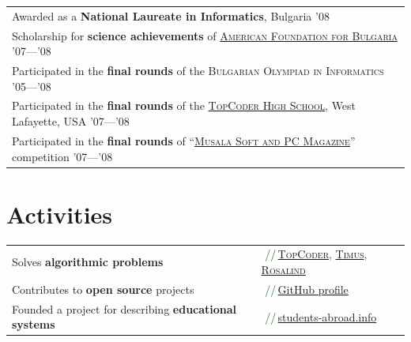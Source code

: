 \documentclass[a4paper,10pt]{article}
\newcommand{\comment}[1]{\small\textcolor{darkgreen}{\,\,//\,#1}}
\begin{document}
{\hspace{3mm}\begin{tabular}{@{•\enskip}p{14.5cm}}
	Awarded as a \textbf{National Laureate in Informatics}, Bulgaria \textsc{'08}\\
        Scholarship for \textbf{science achievements} of \href{http://www.afbulgaria.org/}{\textsc{American Foundation for Bulgaria}} \textsc{'07}---\textsc{'08}\\
	Participated in the \textbf{final rounds} of the \textsc{Bulgarian Olympiad in Informatics} \textsc{'05}---\textsc{'08}\\
        Participated in the \textbf{final rounds} of the \href{http://community.topcoder.com/tc?module=Static&d1=tournaments&d2=home}{\textsc{TopCoder High School}}, West Lafayette, USA \textsc{'07}---\textsc{'08}\\
        Participated in the \textbf{final rounds} of ``\href{http://konkurs.musala.com/}{\textsc{Musala Soft and PC Magazine}}'' competition \textsc{'07}---\textsc{'08}\\
\end{tabular}

\section{Activities}
\hspace{2mm}\begin{tabular}{@{•\enskip}ll}
        Solves \textbf{algorithmic problems} &
              \comment{\href{http://www.topcoder.com/tc?module=MemberProfile&cr=10205233}{\textsc{TopCoder}}, \href{http://acm.timus.ru/author.aspx?id=30642}{\textsc{Timus}}, \href{http://rosalind.info/users/cheater_no1/}{\textsc{Rosalind}} }\\
        Contributes to \textbf{open source} projects &
              \comment{\href{https://github.com/petar-ivanov/}{GitHub profile} }\\
        Founded a project for describing \textbf{educational systems} &
              \comment{\href{http://students-abroad.info/}{students-abroad.info} }\\
        

\end{tabular}}
\end{document}
